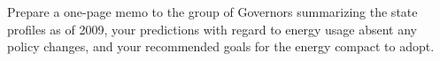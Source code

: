 Prepare a one-page memo to the group of Governors summarizing the state profiles as of 2009, your predictions with regard to energy usage absent any policy changes, and your recommended goals for the energy compact to adopt.    
